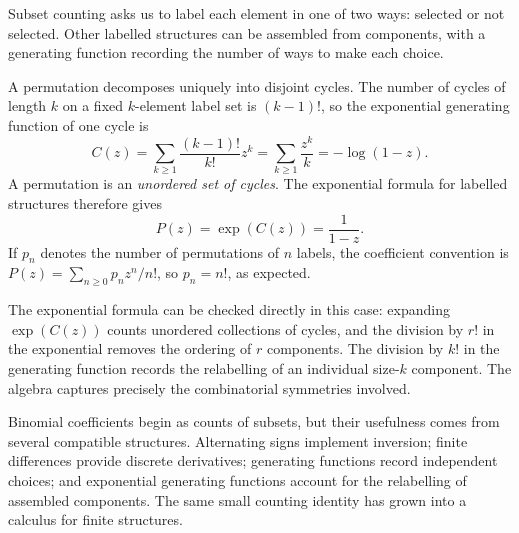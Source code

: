 Subset counting asks us to label each element in one of two ways: selected or not selected. Other labelled structures can be assembled from components, with a generating function recording the number of ways to make each choice.

A permutation decomposes uniquely into disjoint cycles. The number of cycles of length \(k\) on a fixed \(k\)-element label set is \((k-1)!\), so the exponential generating function of one cycle is
\[
 C(z)=\sum_{k\ge1}\frac{(k-1)!}{k!}z^k
     =\sum_{k\ge1}\frac{z^k}{k}=-\log(1-z).
\]
A permutation is an \emph{unordered set of cycles}. The exponential formula for labelled structures therefore gives
\[
 P(z)=\exp(C(z))=\frac1{1-z}.
\]
If \(p_n\) denotes the number of permutations of \(n\) labels, the coefficient convention is
\(P(z)=\sum_{n\ge0}p_nz^n/n!\), so \(p_n=n!\), as expected.

The exponential formula can be checked directly in this case: expanding \(\exp(C(z))\) counts unordered collections of cycles, and the division by \(r!\) in the exponential removes the ordering of \(r\) components. The division by \(k!\) in the generating function records the relabelling of an individual size-\(k\) component. The algebra captures precisely the combinatorial symmetries involved.

Binomial coefficients begin as counts of subsets, but their usefulness comes from several compatible structures. Alternating signs implement inversion; finite differences provide discrete derivatives; generating functions record independent choices; and exponential generating functions account for the relabelling of assembled components. The same small counting identity has grown into a calculus for finite structures.
